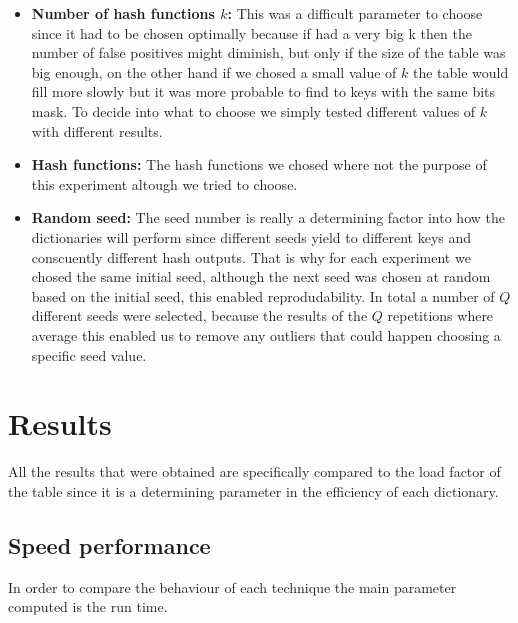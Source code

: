\documentclass{article}
\begin{document}
\begin{itemize}
    \item \textbf{Number of hash functions $k$:}
             This was a difficult parameter to choose since it had to be chosen optimally because if had a very big k then the number of false positives might diminish, but only if the size of the table
             was big enough, on the other hand if we chosed a small value of $k$ the table would fill more slowly but it was more probable to find to keys with the same bits mask. To decide into what to choose 
             we simply tested different values of $k$ with different results. 
             
    \item \textbf{Hash functions:}
            The hash functions we chosed where not the purpose of this experiment altough we tried to choose. 
            
    \item \textbf{Random seed:}
            The seed number is really a determining factor into how the dictionaries will perform since different seeds yield to different keys and conscuently different hash outputs. 
            That is why for each experiment we chosed the same initial seed, although the next seed was chosen at random based on the initial seed, this enabled reprodudability. In total 
            a number of $Q$ different seeds were selected, because the results of the $Q$ repetitions where average this enabled us to remove any outliers that could happen choosing a specific seed value. 
    \end{itemize}
    \section{Results}
    All the results that were obtained are specifically compared to the load factor of the table since it is a determining parameter in the efficiency of each dictionary. 

    \subsection*{Speed performance}
    In order to compare the behaviour of each technique the main parameter computed is the run time. 
    
\end{document}
